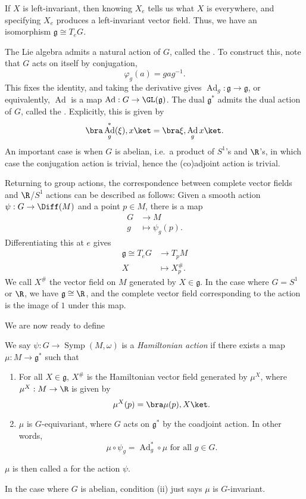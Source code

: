 \documentclass[a4paper]{article}
\DeclareMathOperator{\Symp}{Symp}
\DeclareMathOperator{\Ad}{Ad}
\begin{document}
If $X$ is left-invariant, then knowing $X_e$ tells us what $X$ is everywhere, and specifying $X_e$ produces a left-invariant vector field. Thus, we have an isomorphism $\mathfrak{g} \cong T_e G$.

The Lie algebra admits a natural action of $G$, called the . To construct this, note that $G$ acts on itself by conjugation,
\[
  \varphi_g(a) = gag^{-1}.
\]
This fixes the identity, and taking the derivative gives $\Ad_g: \mathfrak{g} \to \mathfrak{g}$, or equivalently, $\Ad$ is a map $\Ad: G \to \GL(\mathfrak{g})$. The dual $\mathfrak{g}^*$ admits the dual action of $G$, called the . Explicitly, this is given by
\[
  \bra \Ad_g^* (\xi), x\ket = \bra \xi, \Ad_g x\ket.
\]
An important case is when $G$ is abelian, i.e.\ a product of $S^1$'s and $\R$'s, in which case the conjugation action is trivial, hence the (co)adjoint action is trivial.

Returning to group actions, the correspondence between complete vector fields and $\R$/$S^1$ actions can be described as follows: Given a smooth action $\psi: G \to \Diff (M)$ and a point $p \in M$, there is a map
\begin{align*}
  G &\to M\\
  g &\mapsto \psi_g(p).
\end{align*}
Differentiating this at $e$ gives
\begin{align*}
  \mathfrak{g} \cong T_e G &\to T_p M\\
  X &\mapsto X_p^\#.
\end{align*}
We call $X^\#$ the vector field on $M$ generated by $X \in \mathfrak{g}$. In the case where $G = S^1$ or $\R$, we have $\mathfrak{g} \cong \R$, and the complete vector field corresponding to the action is the image of $1$ under this map.

We are now ready to define
\begin{defi}
  We say $\psi: G \to \Symp(M, \omega)$ is a \emph{Hamiltonian action} if there exists a map $\mu: M \to \mathfrak{g}^*$ such that
  \begin{enumerate}
    \item For all $X \in \mathfrak{g}$, $X^\#$ is the Hamiltonian vector field generated by $\mu^X$, where $\mu^X: M \to \R$ is given by
      \[
        \mu^X(p) = \bra \mu(p), X \ket.
      \]
    \item $\mu$ is $G$-equivariant, where $G$ acts on $\mathfrak{g}^*$ by the coadjoint action. In other words,
      \[
        \mu \circ \psi_g = \Ad_g^* \circ \mu\text{ for all }g \in G.
      \]
  \end{enumerate}
  $\mu$ is then called a  for the action $\psi$.
\end{defi}
In the case where $G$ is abelian, condition (ii) just says $\mu$ is $G$-invariant.
\end{document}
